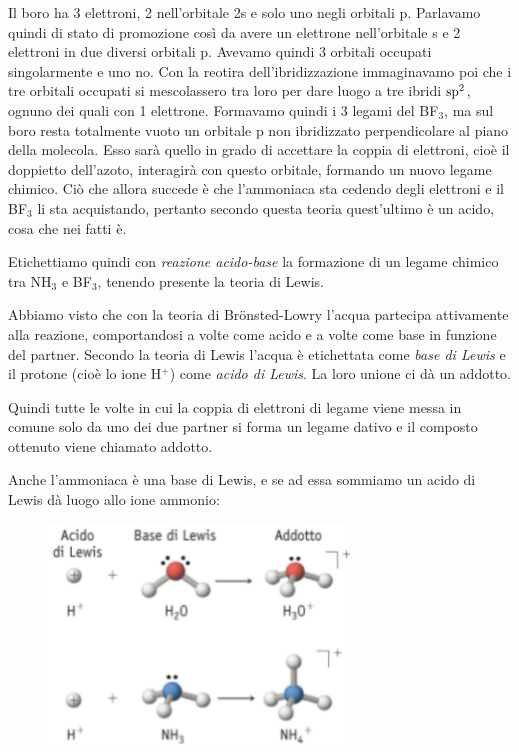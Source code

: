 Il boro ha 3 elettroni, 2 nell'orbitale 2s e solo uno negli orbitali p. Parlavamo quindi di stato di promozione così da avere un elettrone nell'orbitale s e 2 elettroni in due diversi orbitali p. Avevamo quindi 3 orbitali occupati singolarmente e uno no. Con la reotira dell'ibridizzazione immaginavamo poi che i tre orbitali occupati si mescolassero tra loro per dare luogo a tre ibridi $\rm sp^2$, ognuno dei quali con 1 elettrone. Formavamo quindi i 3 legami del BF$_3$, ma sul boro resta totalmente vuoto un orbitale p non ibridizzato perpendicolare al piano della molecola. Esso sarà quello in grado di accettare la coppia di elettroni, cioè il doppietto dell'azoto, interagirà con questo orbitale, formando un nuovo legame chimico. Ciò che allora succede è che l'ammoniaca sta cedendo degli elettroni e il BF$_3$ li sta acquistando, pertanto secondo questa teoria quest'ultimo è un acido, cosa che nei fatti è.

\vspace{0.2cm}Etichettiamo quindi con \textit{reazione acido-base} la formazione di un legame chimico tra NH$_3$ e BF$_3$, tenendo presente la teoria di Lewis.

\vspace{0.2cm}Abbiamo visto che con la teoria di  Br\"{o}nsted-Lowry l'acqua partecipa attivamente alla reazione, comportandosi a volte come acido e a volte come base in funzione del partner. Secondo la teoria di Lewis l'acqua è etichettata come \textit{base di Lewis} e il protone (cioè lo ione H$^+$) come \textit{acido di Lewis}. La loro unione ci dà un addotto.

Quindi tutte le volte in cui la coppia di elettroni di legame viene messa in comune solo da uno dei due partner si forma un legame dativo e il composto ottenuto viene chiamato addotto.

Anche l'ammoniaca è una base di Lewis, e se ad essa sommiamo un acido di Lewis dà luogo allo ione ammonio:

\begin{figure}[htp]
    \centering
    \includegraphics[width=8cm]{immagini/acidi_e_basi_di_lewis.png}
\end{figure}


